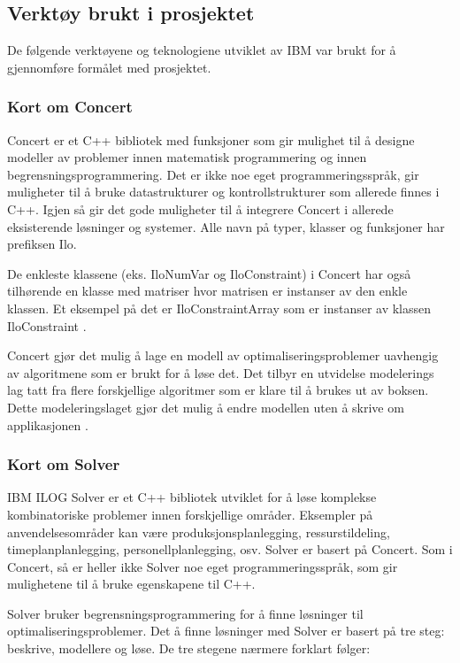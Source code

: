 \subsection{Verktøy brukt i prosjektet}
De følgende verktøyene og teknologiene utviklet av IBM var brukt for å gjennomføre formålet med prosjektet.

\subsubsection{Kort om Concert}
Concert er et C++ bibliotek med funksjoner som gir mulighet til å designe modeller av problemer innen matematisk programmering og innen begrensningsprogrammering. Det er ikke noe eget programmeringsspråk, gir muligheter til å bruke datastrukturer og kontrollstrukturer som allerede finnes i C++. Igjen så gir det gode muligheter til å integrere Concert i allerede eksisterende løsninger og systemer. Alle navn på typer, klasser og funksjoner har prefiksen Ilo.

De enkleste klassene (eks. IloNumVar og IloConstraint) i Concert har også tilhørende en klasse med matriser hvor matrisen er instanser av den enkle klassen. Et eksempel på det er IloConstraintArray som er instanser av klassen IloConstraint \cite{cpconcertilog}.

Concert gjør det mulig å lage en modell av optimaliseringsproblemer uavhengig av algoritmene som er brukt for å løse det. Det tilbyr en utvidelse modelerings lag tatt fra flere forskjellige algoritmer som er klare til å brukes ut av boksen. Dette modeleringslaget gjør det mulig å endre modellen uten å skrive om applikasjonen \cite{cpsolverilog}.

\subsubsection{Kort om Solver}
IBM ILOG Solver er et C++ bibliotek utviklet for å løse komplekse kombinatoriske problemer innen forskjellige områder. Eksempler på anvendelsesområder kan være produksjonsplanlegging, ressurstildeling, timeplanplanlegging, personellplanlegging, osv. Solver er basert på Concert. Som i Concert, så er heller ikke Solver noe eget programmeringsspråk, som gir mulighetene til å bruke egenskapene til C++.

Solver bruker begrensningsprogrammering for å finne løsninger til optimaliseringsproblemer. Det å finne løsninger med Solver er basert på tre steg: beskrive, modellere og løse. De tre stegene nærmere forklart følger:

